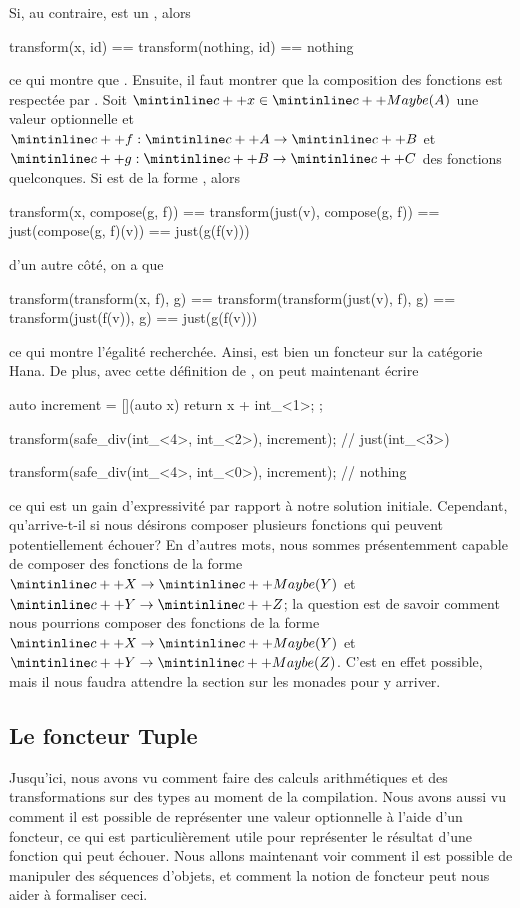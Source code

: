Si, au contraire,  est un , alors
\begin{cpp}
    transform(x, id) == transform(nothing, id)
                     == nothing
\end{cpp}

ce qui montre que . Ensuite, il faut montrer
que la composition des fonctions est respectée par . Soit
$\cc{x} \in \cc{Maybe(A)}$ une valeur optionnelle et $\cc{f} : \cc{A} \to \cc{B}$
et $\cc{g} : \cc{B} \to \cc{C}$ des fonctions quelconques. Si  est de la
forme , alors
\begin{cpp}
    transform(x, compose(g, f)) == transform(just(v), compose(g, f))
                                == just(compose(g, f)(v))
                                == just(g(f(v)))
\end{cpp}

d'un autre côté, on a que
\begin{cpp}
    transform(transform(x, f), g) == transform(transform(just(v), f), g)
                                  == transform(just(f(v)), g)
                                  == just(g(f(v)))
\end{cpp}

ce qui montre l'égalité recherchée. Ainsi,  est bien un foncteur
sur la catégorie Hana. De plus, avec cette définition de , on
peut maintenant écrire
\begin{cpp}
    auto increment = [](auto x) { return x + int_<1>; };

    transform(safe_div(int_<4>, int_<2>), increment); // just(int_<3>)

    transform(safe_div(int_<4>, int_<0>), increment); // nothing
\end{cpp}

ce qui est un gain d'expressivité par rapport à notre solution initiale.
Cependant, qu'arrive-t-il si nous désirons composer plusieurs fonctions
qui peuvent potentiellement échouer? En d'autres mots, nous sommes
présentemment capable de composer des fonctions de la forme
$\cc{X} \to \cc{Maybe(Y)}$ et $\cc{Y} \to \cc{Z}$; la question
est de savoir comment nous pourrions composer des fonctions de la forme
$\cc{X} \to \cc{Maybe(Y)}$ et $\cc{Y} \to \cc{Maybe(Z)}$. C'est en effet
possible, mais il nous faudra attendre la section sur les monades pour y
arriver.


\subsection{Le foncteur Tuple}
Jusqu'ici, nous avons vu comment faire des calculs arithmétiques et des
transformations sur des types au moment de la compilation. Nous avons aussi
vu comment il est possible de représenter une valeur optionnelle à l'aide d'un
foncteur, ce qui est particulièrement utile pour représenter le résultat
d'une fonction qui peut échouer. Nous allons maintenant voir comment il est
possible de manipuler des séquences d'objets, et comment la notion de foncteur
peut nous aider à formaliser ceci.

